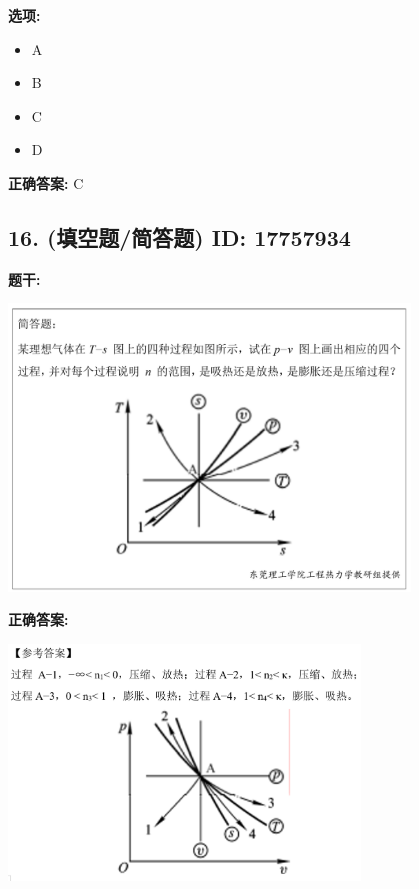 \documentclass[12pt]{article}
\begin{document}
\textbf{选项:}
\begin{itemize}[leftmargin=*]
  \item A

  \item B

  \item C

  \item D

\end{itemize}

\textbf{正确答案:}
C

\vspace{0.5em}\hrulefill\vspace{1em}

\subsection*{16. (填空题/简答题) \small ID: 17757934}

\textbf{题干:}


\begin{center}\includegraphics[width=0.8\textwidth, height=0.25\textheight, keepaspectratio]{question_16_17757934/title_img_1.png}\end{center}

\textbf{正确答案:}

\begin{center}\includegraphics[width=0.7\textwidth, height=0.2\textheight, keepaspectratio]{question_16_17757934/correct_answer_1_img_1.png}\end{center}
\end{document}
